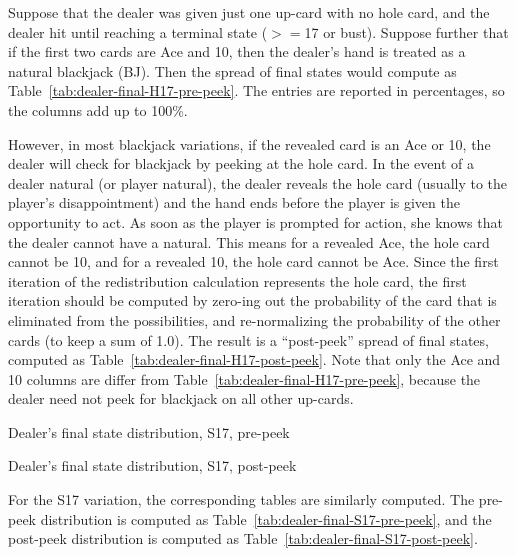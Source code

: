 Suppose that the dealer was given just one up-card with no hole card, 
and the dealer hit until reaching a terminal state ($>=$17 or bust).
Suppose further that if the first two cards are Ace and 10,
then the dealer's hand is treated as a natural blackjack (BJ).
Then the spread of final states would compute as 
Table~\ref{tab:dealer-final-H17-pre-peek}.
The entries are reported in percentages, so the columns add up to 100\%.

However, in most blackjack variations, if the revealed card is an Ace or 10, 
the dealer will check for blackjack by peeking at the hole card.
In the event of a dealer natural (or player natural), 
the dealer reveals the hole card (usually to the player's disappointment)
and the hand ends before the player is given the opportunity to act.
As soon as the player is prompted for action, she knows that the 
dealer cannot have a natural.
This means for a revealed Ace, the hole card cannot be 10, 
and for a revealed 10, the hole card cannot be Ace.
Since the first iteration of the redistribution 
calculation represents the hole card, the first iteration
should be computed by zero-ing out the probability of the
card that is eliminated from the possibilities, and re-normalizing
the probability of the other cards (to keep a sum of 1.0).  
The result is a ``post-peek'' spread of final states, computed as 
Table~\ref{tab:dealer-final-H17-post-peek}.
Note that only the Ace and 10 columns are differ from 
Table~\ref{tab:dealer-final-H17-pre-peek}, 
because the dealer need not peek for blackjack on all other up-cards.

\begin{table}[ht!]
\caption{Dealer's final state distribution, S17, pre-peek}
\begin{center}

\end{center}
\label{tab:dealer-final-S17-pre-peek}
\end{table}

\begin{table}[ht!]
\caption{Dealer's final state distribution, S17, post-peek}
\begin{center}

\end{center}
\label{tab:dealer-final-S17-post-peek}
\end{table}

For the S17 variation, the corresponding tables are similarly computed.
The pre-peek distribution is computed as 
Table~\ref{tab:dealer-final-S17-pre-peek}, 
and the post-peek distribution is computed as 
Table~\ref{tab:dealer-final-S17-post-peek}.

